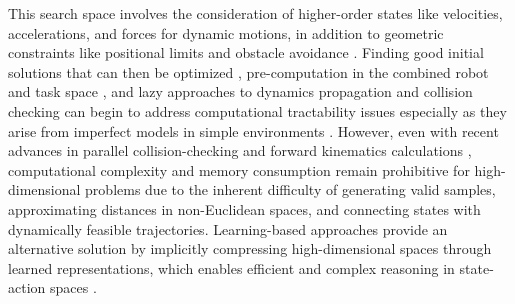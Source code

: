 This search space involves the consideration of higher-order states like velocities, accelerations, and forces for dynamic motions, in addition to geometric constraints like positional limits and obstacle avoidance \cite{schmerling2019kinodynamic}. Finding good initial solutions that can then be optimized \cite{kuntz2019fast}, pre-computation in the combined robot and task space \cite{shome2021asymptotically,briscoe2024exploring}, and lazy approaches to dynamics propagation and collision checking \cite{pasricha2024virtues} can begin to address computational tractability issues especially as they arise from imperfect models in simple environments \cite{pasricha2022pokerrt,briscoe2024exploring,abderezaei2024clutter}.
However, even with recent advances in parallel collision-checking and forward kinematics calculations \cite{sundaralingam2023curobo,thomason2024motions}, computational complexity and memory consumption remain prohibitive for high-dimensional problems due to the inherent difficulty of generating valid samples, approximating distances in non-Euclidean spaces, and connecting states with dynamically feasible trajectories.
Learning-based approaches provide an alternative solution by implicitly compressing high-dimensional spaces through learned representations, which enables efficient and complex reasoning in state-action spaces \cite{qureshi2020motion}.


